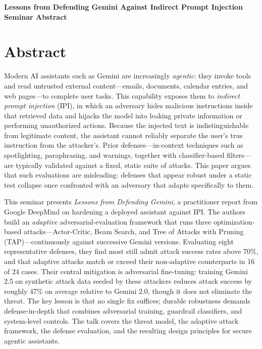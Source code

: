 \documentclass[11pt]{article}
\begin{document}
\begin{center}
{\LARGE\bfseries Lessons from Defending Gemini Against Indirect Prompt Injection}\\[1.1em]
{\large\bfseries Seminar Abstract}\\[0.6em]
{\normalsize \seminarDate}
\end{center}
\vspace{0.6em}
\section*{Abstract}
Modern AI assistants such as Gemini are increasingly \emph{agentic}: they invoke tools and read untrusted external content---emails, documents, calendar entries, and web pages---to complete user tasks. This capability exposes them to \emph{indirect prompt injection} (IPI), in which an adversary hides malicious instructions inside that retrieved data and hijacks the model into leaking private information or performing unauthorized actions. Because the injected text is indistinguishable from legitimate content, the assistant cannot reliably separate the user's true instruction from the attacker's. Prior defenses---in-context techniques such as spotlighting, paraphrasing, and warnings, together with classifier-based filters---are typically validated against a fixed, static suite of attacks. This paper argues that such evaluations are misleading: defenses that appear robust under a static test collapse once confronted with an adversary that adapts specifically to them.

This seminar presents \emph{Lessons from Defending Gemini}, a practitioner report from Google DeepMind on hardening a deployed assistant against IPI. The authors build an \emph{adaptive} adversarial-evaluation framework that runs three optimization-based attacks---Actor-Critic, Beam Search, and Tree of Attacks with Pruning (TAP)---continuously against successive Gemini versions. Evaluating eight representative defenses, they find most still admit attack success rates above 70\%, and that adaptive attacks match or exceed their non-adaptive counterparts in 16 of 24 cases. Their central mitigation is adversarial fine-tuning: training Gemini 2.5 on synthetic attack data seeded by these attackers reduces attack success by roughly 47\% on average relative to Gemini 2.0, though it does not eliminate the threat. The key lesson is that no single fix suffices; durable robustness demands defense-in-depth that combines adversarial training, guardrail classifiers, and system-level controls. The talk covers the threat model, the adaptive attack framework, the defense evaluation, and the resulting design principles for secure agentic assistants.
\end{document}
